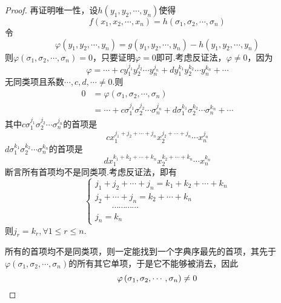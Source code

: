 {\begin{proof}
        再证明唯一性，设$h\left(
            y_1,y_2,\cdots,y_n
            \right)$使得
        \[
            f\left(
            x_1,x_2,\cdots,x_n
            \right)=h\left(
            \sigma_1,\sigma_2,\cdots,\sigma_n
            \right)
        \]令
        \[
            \varphi\left(
            y_1,y_2,\cdots,y_n
            \right)=g\left(
            y_1,y_2,\cdots,y_n
            \right)-h\left(
            y_1,y_2,\cdots,y_n
            \right)
        \]则$
            \varphi\left(
            \sigma_1,\sigma_2,\cdots,\sigma_n
            \right)=0
        $，只要证明$\varphi=0$即可.考虑反证法，$\varphi\neq 0$，因为
        \[
            \varphi =
            \cdots+c y_1^{j_1}y_2^{j_2}\cdots y_n^{j_n}+d y_1^{k_1}y_2^{k_2}\cdots y_n^{k_n}+\cdots
        \]
        无同类项且系数$\cdots,c,d,\cdots\neq 0$.则
        \begin{align*}
            0 & =\varphi\left(
            \sigma_1,\sigma_2,\cdots,\sigma_n
            \right)                                                                                                                \\
              & =\cdots+c\sigma_1^{j_1}\sigma_2^{j_2}\cdots\sigma_n^{j_n}+d\sigma_1^{k_1}\sigma_2^{k_2}\cdots\sigma_n^{k_n}+\cdots
        \end{align*}
        其中$c\sigma_1^{j_1}
            \sigma_2^{j_2}\cdots\sigma_n^{j_n}
        $的首项是\[
            cx_1^{j_1+j_2+\cdots+j_n}x_2^{j_2+\cdots+j_n}\cdots x_n^{j_n}
        \]$d\sigma_1^{k_1}\sigma_2^{k_2}\cdots\sigma_n^{k_n}$的首项是\[
            dx_1^{k_1+k_2+\cdots+k_n}x_2^{k_2+\cdots+k_n}\cdots x_n^{k_n}\]断言所有首项均不是同类项.考虑反证法，即有
        \[
            \begin{cases*}
                j_1+j_2+\cdots+j_n=k_1+k_2+\cdots+k_n \\
                j_2+\cdots+j_n=k_2+\cdots+k_n         \\
                \qquad\cdots\cdots\cdots\cdots        \\
                j_n=k_n
            \end{cases*}
        \]则$j_r=k_r,\forall 1\leqslant r\leqslant n$.

        所有的首项均不是同类项，则一定能找到一个字典序最先的首项，其先于$\varphi
            \left(
            \sigma_1,\sigma_2,\cdots,\sigma_n
            \right)$的所有其它单项，于是它不能够被消去，因此\[
            \varphi\left(
            \sigma_1,\sigma_2,\cdots,\sigma_n
            \right)\neq 0
            \qedhere\]
    \end{proof}
}
